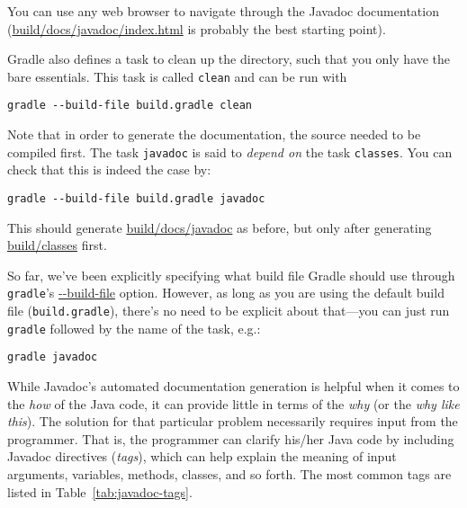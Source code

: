 You can use any web browser to navigate through the Javadoc documentation (\url{build/docs/javadoc/index.html} is probably the best starting point).

Gradle also defines a task to clean up the directory, such that you only have the bare essentials. This task is called \texttt{clean} and can be run with
\begin{lstlisting}[style=basic,style=bash]
gradle --build-file build.gradle clean
\end{lstlisting}


Note that in order to generate the documentation, the source needed to be compiled first. The task \texttt{javadoc} is said to \textit{depend on} the task \texttt{classes}. You can check that this is indeed the case by:
\begin{lstlisting}[style=basic,style=bash]
gradle --build-file build.gradle javadoc
\end{lstlisting}
This should generate \url{build/docs/javadoc} as before, but only after generating \url{build/classes} first.


So far, we've been explicitly specifying what build file Gradle should use through \texttt{gradle}'s \url{--build-file} option. However, as long as you are using the default build file (\texttt{build.gradle}), there's no need to be explicit about that---you can just run \texttt{gradle} followed by the name of the task, e.g.:
\begin{lstlisting}[style=basic,style=bash]
gradle javadoc
\end{lstlisting}

While Javadoc's automated documentation generation is helpful when it comes to the \textit{how} of the Java code, it can provide little in terms of the \textit{why} (or the \textit{why like this}). The solution for that particular problem necessarily requires input from the programmer. That is, the programmer can clarify his/her Java code by including Javadoc directives (\textit{tags}), which can help explain the meaning of input arguments, variables, methods, classes, and so forth. The most common tags are listed in Table~\ref{tab:javadoc-tags}.


